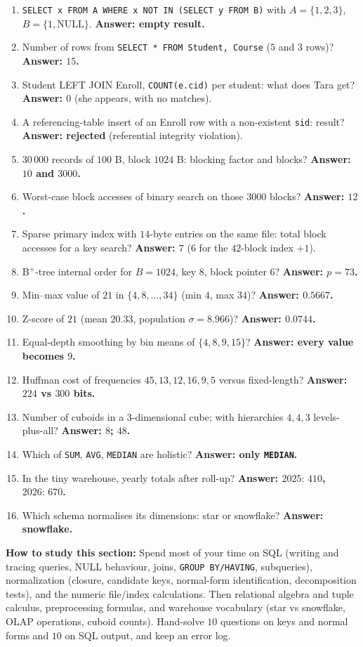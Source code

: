 \documentclass[11pt,a4paper]{article}
\begin{document}
\begin{enumerate}[leftmargin=*,itemsep=4pt]
\item \texttt{SELECT x FROM A WHERE x NOT IN (SELECT y FROM B)} with $A=\{1,2,3\}$, $B=\{1,\text{NULL}\}$. \textbf{Answer: empty result.}
\item Number of rows from \texttt{SELECT * FROM Student, Course} ($5$ and $3$ rows)? \textbf{Answer: $15$.}
\item Student LEFT JOIN Enroll, \texttt{COUNT(e.cid)} per student: what does Tara get? \textbf{Answer: $0$} (she appears, with no matches).
\item A referencing-table insert of an Enroll row with a non-existent \texttt{sid}: result? \textbf{Answer: rejected} (referential integrity violation).
\item $30\,000$ records of $100$ B, block $1024$ B: blocking factor and blocks? \textbf{Answer: $10$ and $3000$.}
\item Worst-case block accesses of binary search on those $3000$ blocks? \textbf{Answer: $12$.}
\item Sparse primary index with $14$-byte entries on the same file: total block accesses for a key search? \textbf{Answer: $7$} ($6$ for the $42$-block index $+1$).
\item B$^+$-tree internal order for $B=1024$, key $8$, block pointer $6$? \textbf{Answer: $p=73$.}
\item Min--max value of $21$ in $\{4,8,\dots,34\}$ (min $4$, max $34$)? \textbf{Answer: $0.5667$.}
\item Z-score of $21$ (mean $20.33$, population $\sigma=8.966$)? \textbf{Answer: $0.0744$.}
\item Equal-depth smoothing by bin means of $\{4,8,9,15\}$? \textbf{Answer: every value becomes $9$.}
\item Huffman cost of frequencies $45,13,12,16,9,5$ versus fixed-length? \textbf{Answer: $224$ vs $300$ bits.}
\item Number of cuboids in a 3-dimensional cube; with hierarchies $4,4,3$ levels-plus-all? \textbf{Answer: $8$; $48$.}
\item Which of \texttt{SUM}, \texttt{AVG}, \texttt{MEDIAN} are holistic? \textbf{Answer: only \texttt{MEDIAN}.}
\item In the tiny warehouse, yearly totals after roll-up? \textbf{Answer: $2025{:}\,410$, $2026{:}\,670$.}
\item Which schema normalises its dimensions: star or snowflake? \textbf{Answer: snowflake.}
\end{enumerate}

\textbf{How to study this section:} Spend most of your time on SQL (writing and tracing queries, NULL behaviour, joins, \texttt{GROUP BY/HAVING}, subqueries), normalization (closure, candidate keys, normal-form identification, decomposition tests), and the numeric file/index calculations. Then relational algebra and tuple calculus, preprocessing formulas, and warehouse vocabulary (star vs snowflake, OLAP operations, cuboid counts). Hand-solve $10$ questions on keys and normal forms and $10$ on SQL output, and keep an error log.
\end{document}
